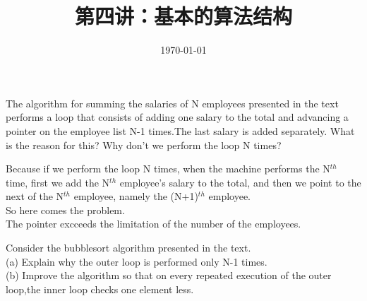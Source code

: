 \documentclass[11pt, a4paper, UTF8]{ctexart}
\title{第四讲：基本的算法结构}
\date{\today}     %
\begin{document}
\maketitle
\noplagiarism	%
\beginthishw	%

\begin{problem}[DH:2.1]	%
   The algorithm for summing the salaries of N employees presented in the text performs a loop that consists of adding one salary to the total and advancing a pointer on the employee list N-1 times.The last salary is added separately. What is the reason for this? Why don't we perform the loop N times? 
\end{problem}

\begin{solution}
  Because if we perform the loop N times, when the machine performs the N$^{th}$ time, first we add the N$^{th}$ employee's salary to the total, and then we point to the next of the N$^{th}$ employee, namely the (N+1)$^{th}$ employee.\\
  So here comes the problem.\\
  The pointer excceeds the limitation of the number of the employees.
\end{solution}

\begin{problem}[DH:2.2]
  Consider the bubblesort algorithm presented in the text.\\
  (a) Explain why the outer loop is performed only N-1 times.\\
  (b) Improve the algorithm so that on every repeated execution of the outer loop,the inner loop checks one element less.\\
\end{problem}
\end{document}
